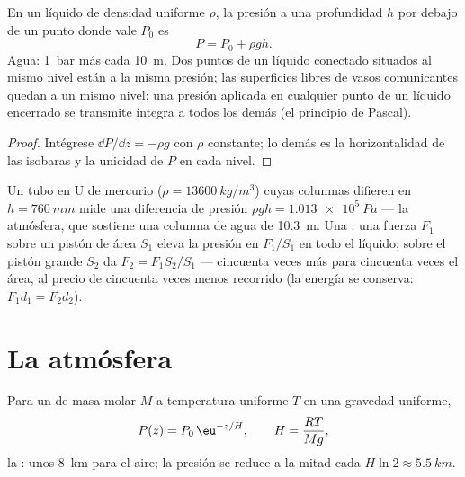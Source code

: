 \begin{corollary}\label{cor:b1:fluid-statics:incompressible}
En un líquido de densidad uniforme $\rho$, la presión a una profundidad $h$
por debajo de un punto donde vale $P_0$ es
\[
P = P_0 + \rho gh .
\]
Agua: \qty{1}{bar} más cada \qty{10}{m}. Dos puntos de un líquido
conectado situados al mismo nivel están a la misma presión; las
superficies libres de vasos comunicantes quedan a un mismo nivel; una
presión aplicada en cualquier punto de un líquido encerrado se transmite
íntegra a todos los demás (el principio de Pascal).
\end{corollary}

\begin{proof}
Intégrese $\dd P/\dd z = -\rho g$ con $\rho$ constante; lo demás es la
horizontalidad de las isobaras y la unicidad de $P$ en cada nivel.
\end{proof}

\begin{example}\label{ex:b1:fluid-statics:manometer}
Un tubo en U de mercurio ($\rho = \qty{13600}{kg/m^3}$) cuyas columnas
difieren en $h = \qty{760}{mm}$ mide una diferencia de presión
$\rho gh = \qty{1.013e5}{Pa}$ --- la atmósfera, que sostiene una columna de
agua de \qty{10.3}{m}. Una : una fuerza $F_1$ sobre un
pistón de área $S_1$ eleva la presión en $F_1/S_1$ en todo el líquido; sobre
el pistón grande $S_2$ da $F_2 = F_1S_2/S_1$ --- cincuenta veces más para
cincuenta veces el área, al precio de cincuenta veces menos recorrido (la
energía se conserva: $F_1d_1 = F_2d_2$).
\end{example}

\section{La atmósfera}

\begin{proposition}\label{prop:b1:fluid-statics:atmosphere}
Para un  de masa molar $M$ a temperatura uniforme $T$ en una
gravedad uniforme,
\[
P(z) = P_0\,\eu^{-z/H}, \qquad H = \frac{RT}{Mg} ,
\]
la \emph{}: unos \qty{8}{km} para el aire; la presión se
reduce a la mitad cada $H\ln2 \approx \qty{5.5}{km}$.
\end{proposition}

